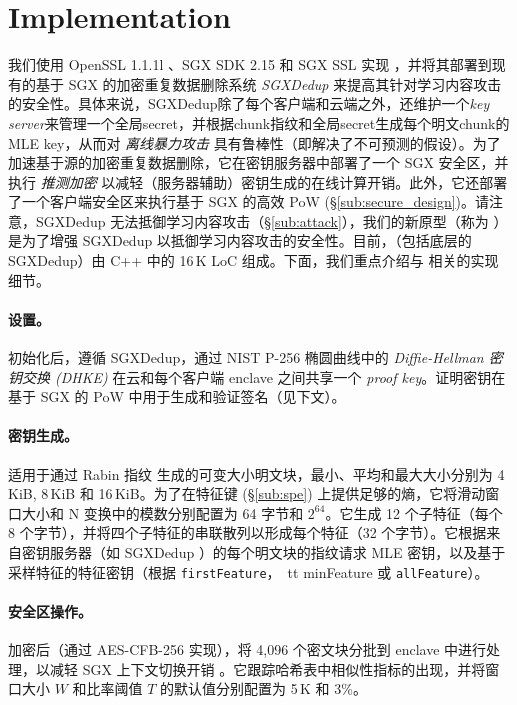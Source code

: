 \section{Implementation}
\label{sec:implementation}
我们使用 OpenSSL 1.1.1l \cite{openssl}、SGX SDK 2.15 \cite{sgxsdk} 和 SGX SSL \cite{sgxssl} 实现 \sysnameF，并将其部署到现有的基于 SGX 的加密重复数据删除系统 {\em SGXDedup} \cite{ren21} 来提高其针对学习内容攻击的安全性。具体来说，SGXDedup除了每个客户端和云端之外，还维护一个{\em key server}来管理一个全局secret，并根据chunk指纹和全局secret生成每个明文chunk的MLE key，从而对 {\em 离线暴力攻击} 具有鲁棒性（即解决了不可预测的假设）\cite{bellare13b}。为了加速基于源的加密重复数据删除，它在密钥服务器中部署了一个 SGX 安全区，并执行 {\em 推测加密} \cite{eduardo19} 以减轻（服务器辅助）密钥生成的在线计算开销。此外，它还部署了一个客户端安全区来执行基于 SGX 的高效 PoW (\S\ref{sub:secure_design})。请注意，SGXDedup 无法抵御学习内容攻击（\S\ref{sub:attack}），我们的新原型（称为 \prototype）是为了增强 SGXDedup 以抵御学习内容攻击的安全性。目前，\prototype（包括底层的 SGXDedup）由 C++ 中的 16\,K LoC 组成。下面，我们重点介绍与 \prototype 相关的实现细节。


\paragraph{设置。}
初始化后，\prototype 遵循 SGXDedup，通过 NIST P-256 椭圆曲线中的 {\em Diffie-Hellman 密钥交换 (DHKE)} 在云和每个客户端 enclave 之间共享一个 {\em proof key}。证明密钥在基于 SGX 的 PoW 中用于生成和验证签名（见下文）。


\paragraph{密钥生成。}
\prototype 适用于通过 Rabin 指纹 \cite{rabin81} 生成的可变大小明文块，最小、平均和最大大小分别为 4\,KiB, 8\,KiB 和 16\,KiB。为了在特征键 (\S\ref{sub:spe}) 上提供足够的熵，它将滑动窗口大小和 N 变换中的模数分别配置为 64 字节和 $2^{64}$。它生成 12 个子特征（每个 8 个字节），并将四个子特征的串联散列以形成每个特征（32 个字节）。它根据来自密钥服务器（如 SGXDedup \cite{ren21}）的每个明文块的指纹请求 MLE 密钥，以及基于采样特征的特征密钥（根据 {\tt firstFeature}，{\ tt minFeature} 或 {\tt allFeature}）。


\paragraph{安全区操作。}
加密后（通过 AES-CFB-256 实现），\prototype 将 4,096 个密文块分批到 enclave 中进行处理，以减轻 SGX 上下文切换开销 \cite{arnautov16}。它跟踪哈希表中相似性指标的出现，并将窗口大小 $W$ 和比率阈值 $T$ 的默认值分别配置为 5\,K 和 3\%。

